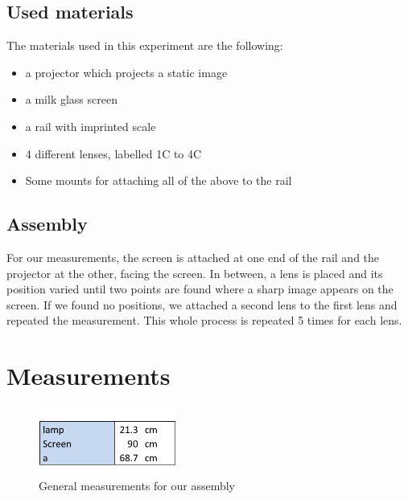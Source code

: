 \documentclass{scrreprt}
\begin{document}
\subsection{Used materials}
The materials used in this experiment are the following:
\begin{itemize}
\item a projector which projects a static image
\item a milk glass screen
\item a rail with imprinted scale
\item 4 different lenses, labelled 1C to 4C
\item Some mounts for attaching all of the above to the rail
\end{itemize}
\subsection{Assembly}
For our measurements, the screen is attached at one end of the rail and the projector at the other, facing the screen. In between, a lens is placed and its position varied until two points are found where a sharp image appears on the screen. If we found no positions, we attached a second lens to the first lens and repeated the measurement. This whole process is repeated 5 times for each lens.

\section{Measurements}

\begin{figure}[H]
	\centering
  \includegraphics[width=0.4\textwidth]{diag/general_measurements.pdf}
	\caption{General measurements for our assembly}
\end{figure}
\end{document}
